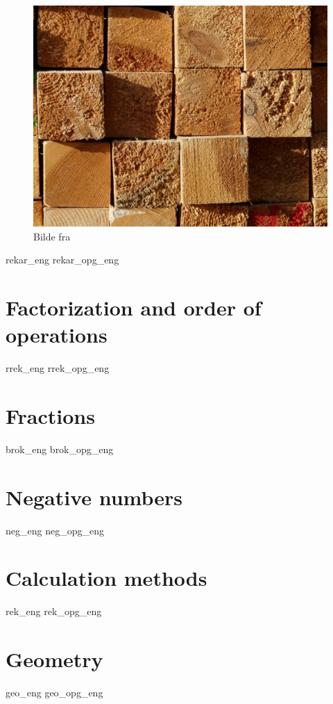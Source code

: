 \begin{figure}
	\centering
	\includegraphics[scale=0.38]{wood} \\
	{\footnotesize Bilde fra } 
\end{figure}
\newpage
{rekar_eng}
{rekar_opg_eng}

\chapter{Factorization and order of operations}
\newpage
{rrek_eng}
{rrek_opg_eng}

\chapter{Fractions}
\newpage
{brok_eng}
{brok_opg_eng}

\chapter{Negative numbers \label{Negtal}}
\newpage
{neg_eng}
{neg_opg_eng}

\chapter{Calculation methods} \label{Rekneartane}
\newpage
{rek_eng}
{rek_opg_eng}

\chapter{Geometry}
\newpage
{geo_eng}
{geo_opg_eng}

